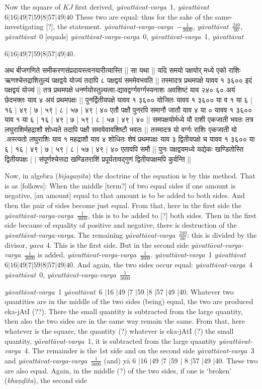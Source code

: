 \documentclass[12pt]{book}
\let\*=\d
\def\bijaganita{\textit{b\={\i}ja\-ga\*ni\-ta}}
\def\ya{\textit{y\=avat\-t\=avat}}
\def\yava{\textit{y\=avat\-t\=avat-varga}}
\def\yavava{\textit{y\=avat\-t\=avat-varga-varga}}
\def\danda{$|$}
\begin{document}
Now the square of $KJ$ first derived, \yava\ 1, \ya\ $6|16|49|7|59|8|57|49|40$
These two are equal: thus for the sake of the same-investigating [?], the statement.
\yavava\ $-\frac{1}{3600}$, \ya\ $\frac{240}{60}$, \ya\ 0 [equals] 
\yavava\ 0, \yava\ 1,
\ya\ 

$6|16|49|7|59|8|57|49|40$. 

\newpage

{\s अथ बीजगणिते समीकरणसंप्रदायस्त्वनयारीत्यास्ति ||
सा यथा ||
यदि समयो पक्षयोर् मध्ये एको
राशिः ऋणश्चेत्तद्राशितुल्यं पक्षद्वये योज्यं तदापि ८ पक्षद्वयं सममेवभवति ||
तस्मादत्र प्रथमपक्षे यावव १ ३६०० इदं पक्षद्वयं योज्यं ||
तत्र प्रथमपक्षे
धनर्णयोस्तुल्यत्वा-द्यावद्वर्ग्गवर्ग्गस्यनाशः अवशिष्टं याव २४० ६० अयं छेदभक्तः याव ४ अयं
प्रथमपक्षः ||
पुनर्द्वितीयपक्षे यावव १ ३६०० योजितः यावव १ ३६०० या व १ या ६ | १६ | ४९ | ७ | ५९ | ८ | ५७ | ४९ |
४०
एतौ पक्षौ पुनरपि समानौ जातौ याव ४ या ० यावव १ ३६०० याव १ या ६ | १६ | ४९ | ७ | ५९ | ८ | ५७ | ४९ | ४० ||
समपक्षयोर्मध्ये यौ राशी एकजाती भवतः तत्र लघुराशिर्महद्राशौ शोध्यते तदापि पक्षौ
समावेवावशिष्टौ भवतः || तस्मादत्र यो वर्ग्गः राशिः एकजाती यो .अस्त्यतो लघुराशिः याव १ महद्राशौ
याव ४ शोधितः शेषं प्रथमपक्षः याव ३ द्वितीयपक्षे च यावव १ ३६०० या ६ | १६ | ४९ | ७ | ५९ | ८ | ५७ | ४९ | ४०
एतावपि समौ || पुनः पक्षद्वयमध्ये यद्येकः खण्डितोस्ति द्वितीयपक्षः | $|$
संपूर्णश्चेत्तदा खण्डितराशिं प्रपूर्यतावद्गुणं द्वितीयपक्षमपि कुर्वन्ति ||} 

\newpage

Now, in algebra (\bijaganita) the doctrine of the equation is by this method.
That is as [follows]:  When the middle [term?] of two equal sides 
if one amount is negative, [an amount] equal to that amount is to be added to
both sides.  And then the pair of sides become just equal. From that, here in 
the first side the \yavava\ $\frac{1}{3600}$, this is to be added to [?] both sides.
Then in the first side because of equality of positive and negative, there is
destruction of the \yavava. The remaining \yava\ $\frac{240}{60}$: this is 
divided by the divisor, $yava$ 4. This is the first side. But in the second side
\yavava\ $\frac{1}{3600}$ is added, \yavava\ $\frac{1}{3600}$. 
\yava\ 1 \ya\ $6|16|49|7|59|8|57|49|40$.  And again, the two sides occur
equal: \yava\ 4 \ya\ 0, \yavava\ $\frac{1}{3600}$ 

\yava\ 1 \ya\ 6 \danda 16 \danda 49 \danda 7 \danda 59 
\danda 8 \danda 57 \danda 49 \danda 40.   Whatever two quantities are in the middle 
of the two sides (being) equal, the two are produced eka-jAtI (??).  There the small 
quantity is subtracted from the large quantity, then also the  two sides are in the same 
way remain the same.  From that, here whatever is the square, the quantity (?) whatever 
is eka-jAtI (?) the small quantity, \yava\ 1, it is subtracted from the large quantity 
\yava\ 4.  The remainder is the 1st side and on the second side \yava\ 3 
and \yavava\ $\frac{1}{3600}$ (and) y\=a 6 \danda 16 \danda 49 \danda 7 \danda 59 \danda 
8 \danda 57 \danda 49 \danda 40.  These two are also equal.  Again, in the middle (?) 
of the two sides, if one is `broken' (\textit{kha\d n\d dita}), the second side 
\end{document}
